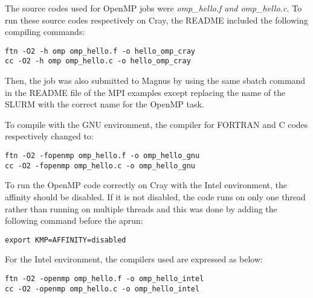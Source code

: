 The source codes used for OpenMP jobs were \emph{omp\_hello.f and omp\_hello.c.} To run these source codes respectively on Cray, the README included the 
following compiling commands:

\begin{tcolorbox}
\begin{Verbatim}[fontsize=\scriptsize]
ftn -O2 -h omp omp_hello.f -o hello_omp_cray
cc -O2 -h omp omp_hello.c -o hello_omp_cray
\end{Verbatim}
\end{tcolorbox}

Then, the job was also submitted to Magnus by using the same sbatch command in the README file of the MPI examples except replacing the name of the SLURM
with the correct name for the OpenMP task.

To compile with the GNU environment, the compiler for FORTRAN and C codes respectively changed to: 

\begin{tcolorbox}
\begin{Verbatim}[fontsize=\scriptsize]
ftn -O2 -fopenmp omp_hello.f -o omp_hello_gnu
cc -O2 -fopenmp omp_hello.c -o omp_hello_gnu
\end{Verbatim}
\end{tcolorbox}

To run the OpenMP code correctly on Cray with the Intel environment, the affinity should be disabled. If it is not disabled, the code runs on only one
thread rather than running on multiple threads and this was done by adding the following command before the aprun:

\begin{tcolorbox}
\begin{Verbatim}[fontsize=\scriptsize]
export KMP=AFFINITY=disabled
\end{Verbatim}
\end{tcolorbox}

For the Intel environment, the compilers used are expressed as below:

\begin{tcolorbox}
\begin{Verbatim}[fontsize=\scriptsize]
ftn -O2 -openmp omp_hello.f -o omp_hello_intel
cc -O2 -openmp omp_hello.c -o omp_hello_intel
\end{Verbatim}
\end{tcolorbox}

